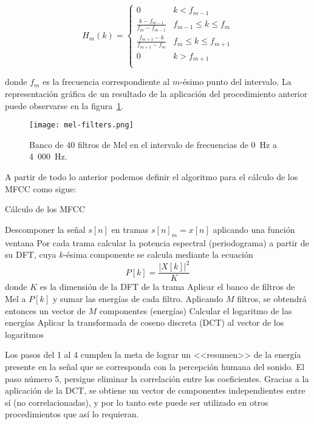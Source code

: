 \begin{equation}
    \label{eq:Mel filterbank}
    H_m(k) = \begin{cases}
                 0 & k < f_{m-1} \\
                 \frac{k-f_{m-1}}{f_m - f_{m-1}} & f_{m-1}\leq k\leq f_m \\
                 \frac{f_{m+1}-k}{f_{m+1}-f_m} & f_m \leq k\leq f_{m+1} \\
                 0 & k > f_{m+1} \\
    \end{cases}
\end{equation}

\noindent
donde $f_m$ es la frecuencia correspondiente al $m$-ésimo punto del intervalo.
La representación gráfica de un resultado de la aplicación del procedimiento anterior puede observarse en la figura~\ref{img:mel-filters}.

\begin{figure}[!h]
    \centering
    \texttt{[image: mel-filters.png]}
    \caption{Banco de 40 filtros de Mel en el intervalo de frecuencias de 0~Hz a 4~000~Hz.}
    \label{img:mel-filters}
\end{figure}

A partir de todo lo anterior podemos definir el algoritmo para el cálculo de los MFCC como sigue:

\begin{algorithm}
    \caption{Cálculo de los MFCC}
    \label{algorithm:MFCC}
    Descomponer la señal $s[n]$ en tramas $s[n]_m = x[n]$ aplicando una función ventana\;
    Por cada trama calcular la potencia espectral (periodograma) a partir de su DFT, cuya $k$-ésima componente se calcula mediante la ecuación
    \[
        P[k] = \frac{|X[k]|^2}{K}
    \]
    donde $K$ es la dimensión de la DFT de la trama\;
    Aplicar el banco de filtros de Mel a $P[k]$ y sumar las energías de cada filtro.
    Aplicando $M$ filtros, se obtendrá entonces un vector de $M$ componentes (energías)\;
    Calcular el logaritmo de las energías\;
    Aplicar la transformada de coseno discreta (DCT) al vector de los logaritmos\;
\end{algorithm}

Los pasos del 1 al 4 cumplen la meta de lograr un <<resumen>> de la energía presente en la señal que se corresponda con la percepción humana del sonido.
El paso número 5, persigue eliminar la correlación entre los coeficientes.
Gracias a la aplicación de la DCT, se obtiene un vector de componentes independientes entre sí (no correlacionadas), y por lo tanto este puede ser utilizado en otros procedimientos que así lo requieran.

